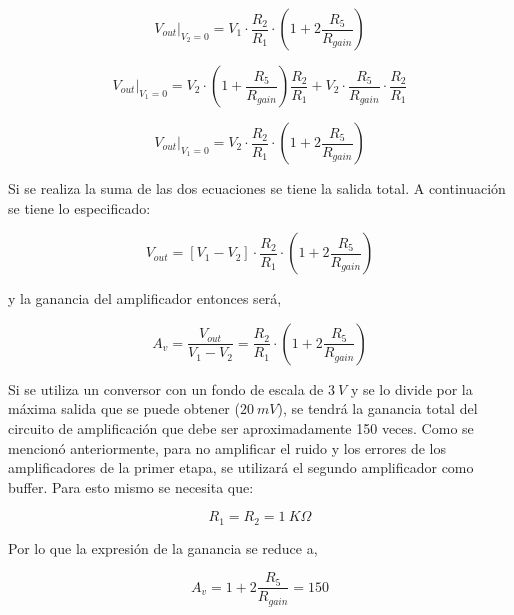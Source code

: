 \documentclass[12pt,A4paper,titlepage]{article}
\begin{document}
\bigskip
\begin{equation}
    V_{out}|_{V_2=0} = V_1 \cdot \frac{R_2}{R_1} \cdot \left(1 + 2 \frac{R_5}{R_{gain}}\right)
\end{equation}

\bigskip
\begin{equation}
    V_{out}|_{V_1=0} = V_2 \cdot \left(1 + \frac{R_5}{R_{gain}}\right) \frac{R_2}{R_1} + V_2 \cdot \frac{R_5}{R_{gain}} \cdot \frac{R_2}{R_1}
\end{equation}

\bigskip
\begin{equation}
    V_{out}|_{V_1=0} = V_2 \cdot \frac{R_2}{R_1} \cdot \left(1 + 2 \frac{R_5}{R_{gain}}\right)
\end{equation}

\bigskip
\hspace{1mm} Si se realiza la suma de las dos ecuaciones se tiene la salida total. A continuación se tiene lo especificado:

\begin{equation}
    V_{out}=\left[V_1-V_2\right] \cdot \frac{R_2}{R_1} \cdot \left(1+2\frac{R_5}{R_{gain}}\right)
\end{equation}

\bigskip
y la ganancia del amplificador entonces será,

\begin{equation}
    A_v=\frac{V_{out}}{V_1-V_2}=\frac{R_2}{R_1} \cdot \left(1+2\frac{R_5}{R_{gain}}\right)
\end{equation}

\bigskip
\hspace{1mm} Si se utiliza un conversor con un fondo de escala de \(3~V\) y se lo divide por la máxima salida que se puede obtener (\(20~mV\)), se tendrá la ganancia total del circuito de amplificación que debe ser aproximadamente 150 veces. Como se mencionó anteriormente, para no amplificar el ruido y los errores de los amplificadores de la primer etapa, se utilizará el segundo amplificador como buffer. Para esto mismo se necesita que:

\begin{equation}
    R_1=R_2=1~K\Omega
\end{equation}

\bigskip
\hspace{1mm} Por lo que la expresión de la ganancia se reduce a,

\begin{equation}
    A_v=1+2\frac{R_5}{R_{gain}}=150
\end{equation}
\end{document}
